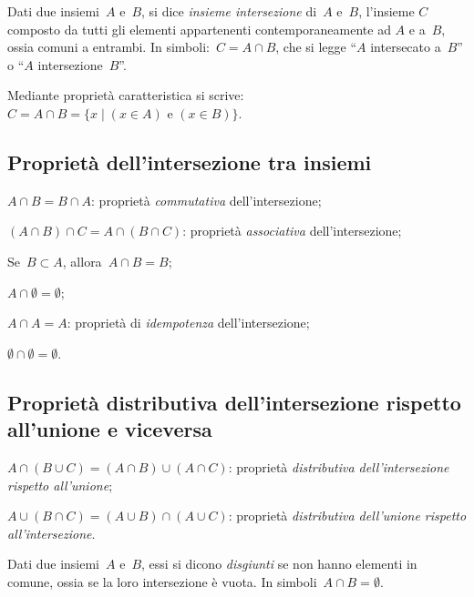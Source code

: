 \begin{definizione}
Dati due insiemi~$A$ e~$B$, si dice \emph{insieme intersezione} di~$A$ e~$B$, l'insieme
$C$ composto da tutti gli elementi appartenenti contemporaneamente ad
$A$ e a~$B$, ossia comuni a entrambi.
In simboli:~$C=A\cap B$, che si legge
``$A$ intersecato a~$B$'' o ``$A$ intersezione~$B$''.
\end{definizione}
\begin{center}
 
\end{center}
Mediante proprietà caratteristica si scrive:~$C=A\cap B=\{x\mid (x\in A)\text{ e }(x\in B)\}$.

\subsection{Proprietà dell'intersezione tra insiemi}

\begin{enumeratea}
\item $A\cap B=B\cap A$: proprietà \emph{commutativa} dell'intersezione;
\item $(A\cap B)\cap C=A\cap (B\cap C)$: proprietà \emph{associativa} dell'intersezione;
\item Se~$B\subset A$, allora~$A\cap B=B$;
\item $A\cap \emptyset =\emptyset$;
\item $A\cap A=A$: proprietà di \emph{idempotenza} dell'intersezione;
\item $\emptyset \cap \emptyset =\emptyset$.
\end{enumeratea}

\subsection[Proprietà distributiva dell'intersezione]{Proprietà distributiva dell'intersezione rispetto all'unione e viceversa}

\begin{enumeratea}
\item $A\cap (B\cup C)=(A\cap B)\cup (A\cap C)$: proprietà \emph{distributiva dell'intersezione rispetto all'unione};
\item $A\cup (B\cap C)=(A\cup B)\cap (A\cup C)$: proprietà \emph{distributiva dell'unione rispetto all'intersezione}.
\end{enumeratea}

\begin{definizione}
Dati due insiemi~$A$ e~$B$, essi si dicono \emph{disgiunti} se non hanno elementi in comune, ossia se la loro intersezione è vuota. In simboli~$A \cap B = \emptyset$.
\end{definizione}

